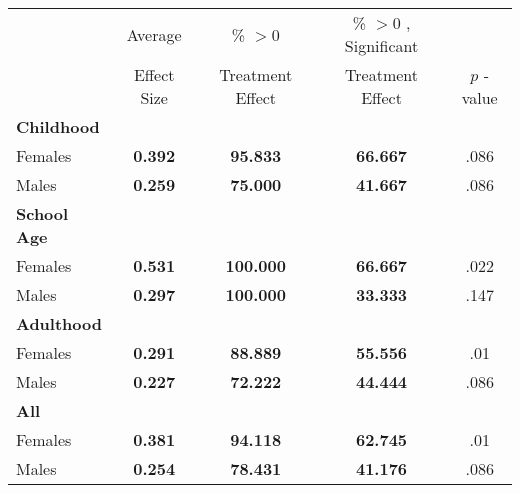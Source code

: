 \begin{tabular}{l c c c c}
\toprule
 & Average & \% $ >0 $ & \% $ >0 $ , Significant & \citet{Rosenbaum_2005_Distribution_JRSS} \\
 & Effect Size & Treatment Effect & Treatment Effect & $ p $ -value \\
\midrule
\textbf{Childhood} & & & & \\
\quad Females &  \textbf{    0.392} & \textbf{   95.833} & \textbf{   66.667} & .086 \\
\quad Males &  \textbf{    0.259} & \textbf{   75.000} & \textbf{   41.667} & .086 \\
\midrule
\textbf{School Age} & & & & \\
\quad Females &  \textbf{    0.531} & \textbf{  100.000} & \textbf{   66.667} & .022 \\
\quad Males &  \textbf{    0.297} & \textbf{  100.000} & \textbf{   33.333} & .147 \\
\midrule
\textbf{Adulthood} & & & & \\
\quad Females &  \textbf{    0.291} & \textbf{   88.889} & \textbf{   55.556} & .01 \\
\quad Males &  \textbf{    0.227} & \textbf{   72.222} & \textbf{   44.444} & .086 \\
\midrule
\textbf{All} & & & & \\
\quad Females &  \textbf{    0.381} & \textbf{   94.118} & \textbf{   62.745} & .01 \\
\quad Males &  \textbf{    0.254} & \textbf{   78.431} & \textbf{   41.176} & .086 \\
\bottomrule
\end{tabular}
